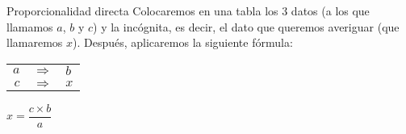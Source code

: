 \begin{infocard}{Proporcionalidad directa}
    Colocaremos en una tabla los 3 datos (a los que llamamos $a$, $b$ y $c$) y
    la incógnita, es decir, el dato que queremos averiguar (que llamaremos
    $x$).
    Después, aplicaremos la siguiente fórmula:
    \begin{center}
        \begin{tabular}{r>{\centering}p{0.2cm}l}
            $a$ & $\Rightarrow$ & $b$ \\
            $c$ & $\Rightarrow$ & $x$
        \end{tabular}\quad$x=\dfrac{c \times b}{a}$
    \end{center}
\end{infocard}
